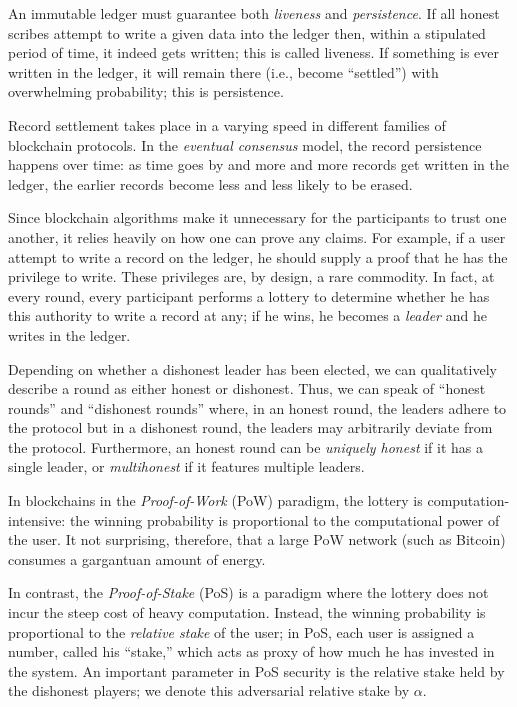 An immutable ledger must guarantee both \emph{liveness} and \emph{persistence}.
If all honest scribes attempt to write a given data into the ledger then, within a stipulated period of time, 
it indeed gets written; this is called liveness. 
If something is ever written in the ledger, it will remain there (i.e., become ``settled'') with overwhelming probability; 
this is persistence. 

Record settlement takes place in a varying speed in 
different families of blockchain protocols.
In the \emph{eventual consensus} model, 
the record persistence happens over time: 
as time goes by and more and more records get written in the ledger, 
the earlier records become less and less likely to be erased. 

Since blockchain algorithms make it unnecessary 
for the participants to trust one another, 
it relies heavily on how one can prove any claims. 
For example, if a user attempt to write a record on the ledger, 
he should supply a proof that he has the privilege to write. 
These privileges are, by design, a rare commodity. 
In fact, 
at every round, 
every participant performs a lottery to determine 
whether he has this authority to write a record at any; 
if he wins, he becomes a \emph{leader} and he writes in the ledger. 


Depending on whether a dishonest leader has been elected, 
we can qualitatively describe a round as either honest or dishonest. 
Thus, we can speak of ``honest rounds'' and ``dishonest rounds'' 
where, in an honest round, the leaders adhere to the protocol but 
in a dishonest round, the leaders may arbitrarily deviate from the protocol. 
Furthermore, an honest round can be \emph{uniquely honest} if it has a single leader, 
or \emph{multihonest} if it features multiple leaders.


In blockchains in the \emph{Proof-of-Work} (PoW) paradigm, 
the lottery is computation-intensive: 
the winning probability is proportional to the computational power of the user. 
It not surprising, therefore, that a large PoW network (such as Bitcoin) 
consumes a gargantuan amount of energy.

In contrast, the \emph{Proof-of-Stake} (PoS) is a paradigm where 
the lottery does not incur the steep cost of heavy computation. 
Instead, the winning probability is proportional to the \emph{relative stake} of the user; 
in PoS, each user is assigned a number, called his ``stake,'' 
which acts as proxy of how much he has invested in the system. 
An important parameter in PoS security is the relative stake held by the dishonest players; 
we denote this adversarial relative stake by $\alpha$.

